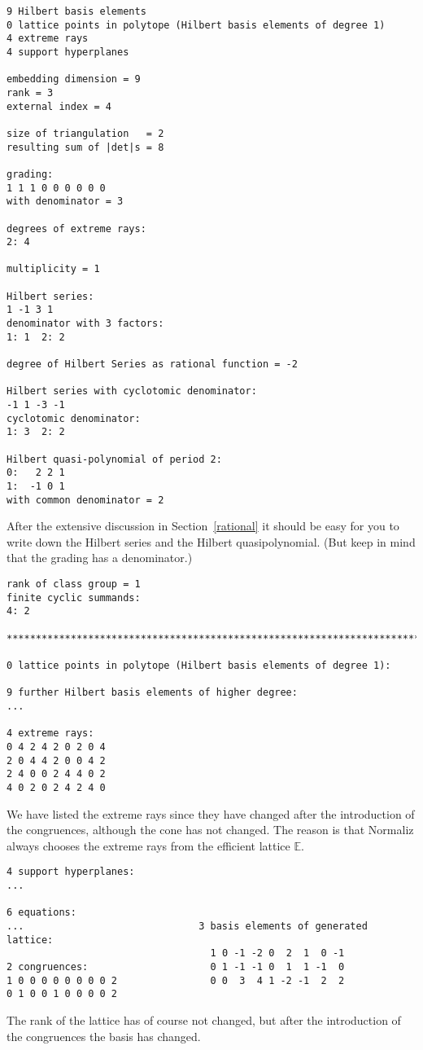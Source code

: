 \documentclass[12pt,a4paper]{scrartcl}
\theoremstyle{definition}
\def\EE{{\mathbb E}}
\begin{document}
\begin{Verbatim}
9 Hilbert basis elements
0 lattice points in polytope (Hilbert basis elements of degree 1)
4 extreme rays
4 support hyperplanes

embedding dimension = 9
rank = 3
external index = 4

size of triangulation   = 2
resulting sum of |det|s = 8

grading:
1 1 1 0 0 0 0 0 0 
with denominator = 3

degrees of extreme rays:
2: 4  

multiplicity = 1

Hilbert series:
1 -1 3 1 
denominator with 3 factors:
1: 1  2: 2  

degree of Hilbert Series as rational function = -2

Hilbert series with cyclotomic denominator:
-1 1 -3 -1 
cyclotomic denominator:
1: 3  2: 2  

Hilbert quasi-polynomial of period 2:
0:   2 2 1
1:  -1 0 1
with common denominator = 2
\end{Verbatim}
After the extensive discussion in Section~\ref{rational} it should be easy for you to write down the Hilbert series and the Hilbert quasipolynomial. (But keep in mind that the grading has a denominator.)
\begin{Verbatim}
rank of class group = 1
finite cyclic summands:
4: 2  

***********************************************************************

0 lattice points in polytope (Hilbert basis elements of degree 1):

9 further Hilbert basis elements of higher degree:
...

4 extreme rays:
0 4 2 4 2 0 2 0 4
2 0 4 4 2 0 0 4 2
2 4 0 0 2 4 4 0 2
4 0 2 0 2 4 2 4 0
\end{Verbatim}
We have listed the extreme rays since they have changed after the introduction of the congruences, although the cone has not changed. The reason is that Normaliz always chooses the extreme rays from the efficient lattice $\EE$.
\begin{Verbatim}
4 support hyperplanes:
...

6 equations:
...                              3 basis elements of generated lattice:
                                   1 0 -1 -2 0  2  1  0 -1
2 congruences:                     0 1 -1 -1 0  1  1 -1  0
1 0 0 0 0 0 0 0 0 2                0 0  3  4 1 -2 -1  2  2
0 1 0 0 1 0 0 0 0 2
\end{Verbatim}
The rank of the lattice has of course not changed, but after the introduction of the congruences the basis has changed.
\end{document}
